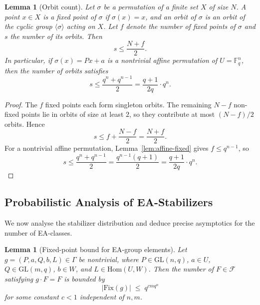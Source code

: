 \documentclass[11pt]{article}
\newtheorem{lemma}[theorem]{Lemma}
\theoremstyle{definition}
\newcommand{\F}{\mathbb{F}}
\newcommand{\Fcal}{\mathcal{F}}
\newcommand{\Gam}{\Gamma}
\newcommand{\GL}{\mathrm{GL}}
\newcommand{\Hom}{\mathrm{Hom}}
\newcommand{\Fix}{\mathrm{Fix}}
\begin{document}
\begin{lemma}[Orbit count]\label{lem:orbit-count}
Let $\sigma$ be a permutation of a finite set $X$ of size $N$.
A point $x\in X$ is a \emph{fixed point of $\sigma$} if $\sigma(x)=x$, and an
\emph{orbit of $\sigma$} is an orbit of the cyclic group $\langle\sigma\rangle$ acting
on $X$. Let $f$ denote the number of fixed points of $\sigma$ and $s$ the number of its
orbits. Then
\[
   s\le \frac{N+f}{2}.
\]
In particular, if $\sigma(x)=Px+a$ is a nontrivial affine permutation of $U=\F_q^n$,
then the number of orbits satisfies
\[
   s\le \frac{q^n+q^{n-1}}{2} = \frac{q+1}{2q}\cdot q^n.
\]
\end{lemma}

\begin{proof}
The $f$ fixed points each form singleton orbits. The remaining $N-f$ non-fixed points
lie in orbits of size at least $2$, so they contribute at most $(N-f)/2$ orbits.
Hence
\[
   s\le f + \frac{N-f}{2} = \frac{N+f}{2}.
\]
For a nontrivial affine permutation, Lemma~\ref{lem:affine-fixed} gives $f\le q^{n-1}$,
so
\[
   s \le \frac{q^n+q^{n-1}}{2}
   = \frac{q^{n-1}(q+1)}{2}
   = \frac{q+1}{2q}\cdot q^n.
\]
\end{proof}

\subsection{Probabilistic Analysis of EA-Stabilizers}

We now analyse the stabilizer distribution and deduce
precise asymptotics for the number of EA-classes.

\begin{lemma}[Fixed-point bound for EA-group elements]\label{lem:fix-g}
Let $g=(P,a,Q,b,L)\in \Gam$ be nontrivial, where $P\in\GL(n,q)$, $a\in U$,
$Q\in\GL(m,q)$, $b\in W$, and $L\in\Hom(U,W)$.
Then the number of $F\in\Fcal$ satisfying $g\cdot F = F$ is bounded by
\[
   |\Fix(g)| \;\le\; q^{cmq^n}
\]
for some constant $c<1$ independent of $n,m$.
\end{lemma}
\end{document}
